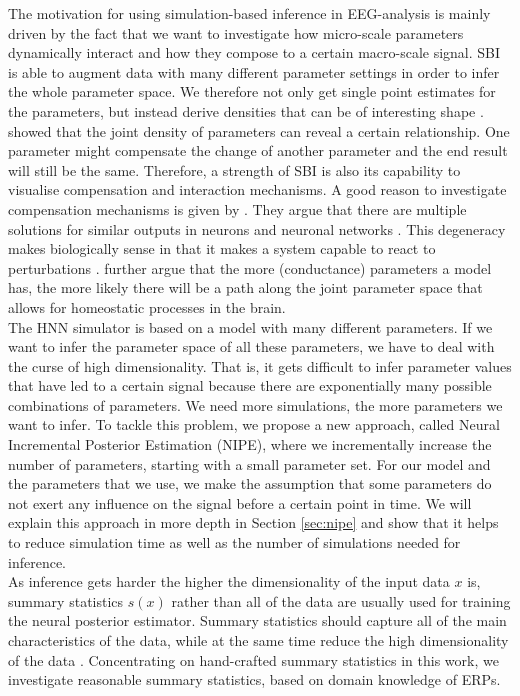 \documentclass[12pt]{extreport}
\begin{document}
The motivation for using simulation-based inference in EEG-analysis is mainly driven by the fact that we want to investigate how micro-scale parameters dynamically interact and how they compose to a certain macro-scale signal. SBI is able to augment data with many different parameter settings in order to infer the whole parameter space. We therefore not only get single point estimates for the parameters, but instead derive densities that can be of interesting shape \citep{gonccalves2020training}. \cite{gonccalves2020training} showed that the joint density of parameters can reveal a certain relationship. One parameter might compensate the change of another parameter and the end result will still be the same. Therefore, a strength of SBI is also its capability to visualise compensation and interaction mechanisms. 
A good reason to investigate compensation mechanisms is given by \cite{marder2011multiple}. They argue that there are multiple solutions for similar outputs in neurons and neuronal networks \citep{marder2011multiple}. This degeneracy makes biologically sense in that it makes a system capable to react to perturbations \citep{marder2011multiple}. \cite{marder2011multiple} further argue that the more (conductance) parameters a model has, the more likely there will be a path along the joint parameter space that allows for homeostatic processes in the brain.\\

The HNN simulator is based on a model with many different parameters. If we want to infer the parameter space of all these parameters, we have to deal with the curse of high dimensionality. That is, it gets difficult to infer parameter values that have led to a certain signal because there are exponentially many possible combinations of parameters. We need more simulations, the more parameters we want to infer. To tackle this problem, we propose a new approach, called Neural Incremental Posterior Estimation (NIPE), where we incrementally increase the number of parameters, starting with a small parameter set. For our model and the parameters that we use, we make the assumption that some parameters do not exert any influence on the signal before a certain point in time. We will explain this approach in more depth in Section \ref{sec:nipe} and show that it helps to reduce simulation time as well as the number of simulations needed for inference. \\

As inference gets harder the higher the dimensionality of the input data $x$ is, summary statistics $s(x)$ rather than all of the data are usually used for training the neural posterior estimator. Summary statistics should capture all of the main characteristics of the data, while at the same time reduce the high dimensionality of the data \citep{lueckmann2021benchmarking}. Concentrating on hand-crafted summary statistics in this work, we investigate reasonable summary statistics, based on domain knowledge of ERPs. 
\end{document}
